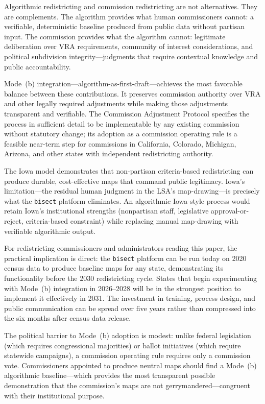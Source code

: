 Algorithmic redistricting and commission redistricting are not alternatives. They are complements. The algorithm provides what human commissioners cannot: a verifiable, deterministic baseline produced from public data without partisan input. The commission provides what the algorithm cannot: legitimate deliberation over VRA requirements, community of interest considerations, and political subdivision integrity---judgments that require contextual knowledge and public accountability.

Mode~(b) integration---algorithm-as-first-draft---achieves the most favorable balance between these contributions. It preserves commission authority over VRA and other legally required adjustments while making those adjustments transparent and verifiable. The Commission Adjustment Protocol specifies the process in sufficient detail to be implementable by any existing commission without statutory change; its adoption as a commission operating rule is a feasible near-term step for commissions in California, Colorado, Michigan, Arizona, and other states with independent redistricting authority.

The Iowa model demonstrates that non-partisan criteria-based redistricting can produce durable, cost-effective maps that command public legitimacy. Iowa's limitation---the residual human judgment in the LSA's map-drawing---is precisely what the \texttt{bisect} platform eliminates. An algorithmic Iowa-style process would retain Iowa's institutional strengths (nonpartisan staff, legislative approval-or-reject, criteria-based constraint) while replacing manual map-drawing with verifiable algorithmic output.

For redistricting commissioners and administrators reading this paper, the practical implication is direct: the \texttt{bisect} platform can be run today on 2020 census data to produce baseline maps for any state, demonstrating its functionality before the 2030 redistricting cycle. States that begin experimenting with Mode~(b) integration in 2026--2028 will be in the strongest position to implement it effectively in 2031. The investment in training, process design, and public communication can be spread over five years rather than compressed into the six months after census data release.

The political barrier to Mode~(b) adoption is modest: unlike federal legislation (which requires congressional majorities) or ballot initiatives (which require statewide campaigns), a commission operating rule requires only a commission vote. Commissioners appointed to produce neutral maps should find a Mode~(b) algorithmic baseline---which provides the most transparent possible demonstration that the commission's maps are not gerrymandered---congruent with their institutional purpose.
